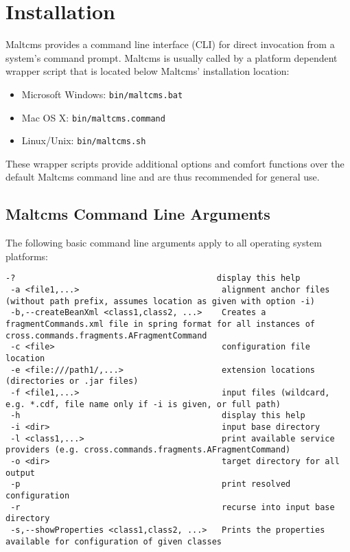 \chapter{Installation}
Maltcms provides a command line interface (CLI) for direct invocation 
from a system's command prompt. Maltcms is usually called by a platform 
dependent wrapper script that is located below Maltcms' installation location:
\begin{itemize}
	\item Microsoft Windows: \verb|bin/maltcms.bat|
	\item Mac OS X: \verb|bin/maltcms.command|
	\item Linux/Unix: \verb|bin/maltcms.sh|
\end{itemize}
These wrapper scripts provide additional options and comfort functions 
over the default Maltcms command line and are thus recommended for general use.

\section{Maltcms Command Line Arguments}
The following basic command line arguments apply to all operating system platforms:
\begin{lstlisting}[style=script]
 -?                                         display this help
 -a <file1,...>                             alignment anchor files (without path prefix, assumes location as given with option -i)
 -b,--createBeanXml <class1,class2, ...>    Creates a fragmentCommands.xml file in spring format for all instances of cross.commands.fragments.AFragmentCommand
 -c <file>                                  configuration file location
 -e <file:///path1/,...>                    extension locations (directories or .jar files)
 -f <file1,...>                             input files (wildcard, e.g. *.cdf, file name only if -i is given, or full path)
 -h                                         display this help
 -i <dir>                                   input base directory
 -l <class1,...>                            print available service providers (e.g. cross.commands.fragments.AFragmentCommand)
 -o <dir>                                   target directory for all output
 -p                                         print resolved configuration
 -r                                         recurse into input base directory
 -s,--showProperties <class1,class2, ...>   Prints the properties available for configuration of given classes
\end{lstlisting}

